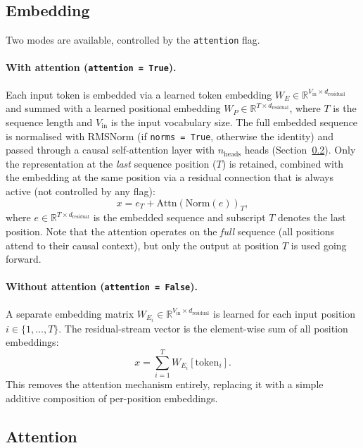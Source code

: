 \documentclass[11pt,a4paper]{article}
\begin{document}
\subsection{Embedding}
\label{sec:embedding}

Two modes are available, controlled by the \texttt{attention} flag.




\paragraph{With attention (\texttt{attention = True}).}
Each input token is embedded via a learned token embedding $W_E \in \mathbb{R}^{V_\text{in} \times d_\text{residual}}$ and summed with a learned positional embedding $W_P \in \mathbb{R}^{T \times d_\text{residual}}$, where $T$ is the sequence length and $V_\text{in}$ is the input vocabulary size. The full embedded sequence is normalised with RMSNorm (if \texttt{norms = True}, otherwise the identity) and passed through a causal self-attention layer with $n_\text{heads}$ heads (Section~\ref{sec:attention}). Only the representation at the \emph{last} sequence position ($T$) is retained, combined with the embedding at the same position via a residual connection that is always active (not controlled by any flag):
\[
    x = e_T + \text{Attn}\!\left(\text{Norm}(e)\right)_T,
\]
where $e \in \mathbb{R}^{T \times d_\text{residual}}$ is the embedded sequence and subscript $T$ denotes the last position. Note that the attention operates on the \emph{full} sequence (all positions attend to their causal context), but only the output at position $T$ is used going forward.

\paragraph{Without attention (\texttt{attention = False}).}
A separate embedding matrix $W_{E_i} \in \mathbb{R}^{V_\text{in}\times d_\text{residual}}$ is learned for each input position $i \in \{1,\dots,T\}$. The residual-stream vector is the element-wise sum of all position embeddings:
\[
    x = \sum_{i=1}^{T} W_{E_i}[\text{token}_i].
\]
This removes the attention mechanism entirely, replacing it with a simple additive composition of per-position embeddings.

\subsection{Attention}
\label{sec:attention}
\end{document}

